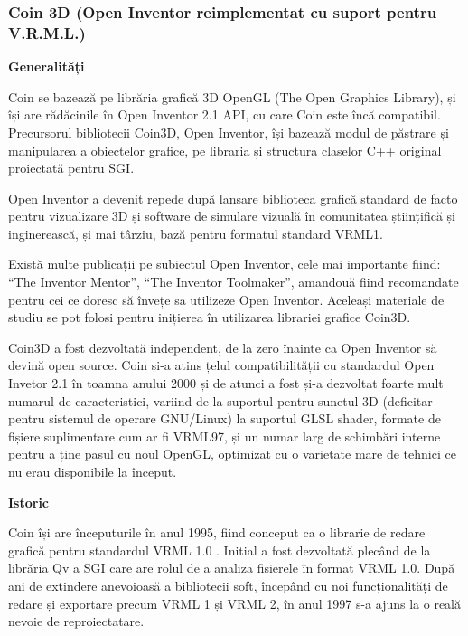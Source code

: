 \subsubsection{Coin 3D (Open Inventor reimplementat cu suport pentru V.R.M.L.)}
\par \textbf{Generalități}
\par Coin se bazează pe librăria grafică 3D OpenGL (The Open Graphics Library), și își are rădăcinile în Open Inventor 2.1 API, cu care Coin este încă compatibil. Precursorul bibliotecii Coin3D, Open Inventor, își bazează modul de păstrare și manipularea a obiectelor grafice, pe libraria și structura claselor C++ original proiectată pentru SGI.\cite{COIN_COMM}
\par Open Inventor a devenit repede după lansare biblioteca grafică standard de facto pentru vizualizare 3D și software de simulare vizuală în comunitatea științifică și inginerească, și mai târziu, bază pentru formatul standard VRML1. 
\par Există multe publicații pe subiectul Open Inventor, cele mai importante fiind: “The Inventor Mentor”, “The Inventor Toolmaker”, amandouă fiind recomandate pentru cei ce doresc să învețe sa utilizeze Open Inventor. Aceleași materiale de studiu se pot folosi pentru inițierea în utilizarea librariei grafice Coin3D.\cite{COIN_COMM}
\par Coin3D a fost dezvoltată independent, de la zero înainte ca Open Inventor să devină open source. Coin și-a atins țelul compatibilității cu standardul Open Invetor 2.1 în toamna anului 2000 și de atunci a fost și-a dezvoltat foarte mult numarul de caracteristici, variind de la suportul pentru sunetul 3D (deficitar pentru sistemul de operare GNU/Linux) la suportul GLSL shader, formate de fișiere suplimentare cum ar fi VRML97, și un numar larg de schimbări interne pentru a ține pasul cu noul OpenGL, optimizat cu o varietate mare de tehnici ce nu erau disponibile la început.\cite{COIN_COMM} 
\par \textbf{Istoric}
\par Coin își are începuturile în anul 1995, fiind conceput ca o librarie de redare grafică pentru standardul VRML 1.0 . Initial a fost dezvoltată plecând de la librăria Qv a SGI care are rolul de a analiza fisierele în format VRML 1.0. După ani de extindere anevoioasă a bibliotecii soft, începând cu noi funcționalități de redare și exportare precum VRML 1 și VRML 2, în anul 1997 s-a ajuns la o reală nevoie de reproiectatare.\cite{COIN_COMM}
